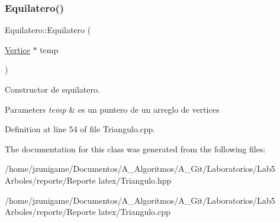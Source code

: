 \subsubsection{\texorpdfstring{Equilatero()}{Equilatero()}}
{\footnotesize\ttfamily Equilatero\+::\+Equilatero (\begin{DoxyParamCaption}\item[{\hyperlink{class_vertice}{Vertice} $\ast$}]{temp }\end{DoxyParamCaption})}



Constructor de equilatero. 


\begin{DoxyParams}{Parameters}
{\em temp} & es un puntero de un arreglo de vertices \\
\hline
\end{DoxyParams}


Definition at line 54 of file Triangulo.\+cpp.



The documentation for this class was generated from the following files\+:\begin{DoxyCompactItemize}
\item 
/home/jzunigame/\+Documentos/\+A\+\_\+\+Algoritmos/\+A\+\_\+\+Git/\+Laboratorios/\+Lab5 Arboles/reporte/\+Reporte latex/Triangulo.\+hpp\item 
/home/jzunigame/\+Documentos/\+A\+\_\+\+Algoritmos/\+A\+\_\+\+Git/\+Laboratorios/\+Lab5 Arboles/reporte/\+Reporte latex/Triangulo.\+cpp\end{DoxyCompactItemize}
